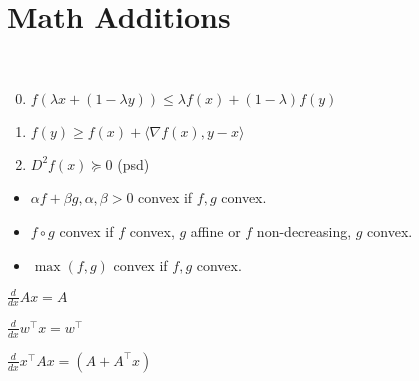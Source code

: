 \section{Math Additions}

\begin{definition}[Convexity] \
  \begin{enumerate}
    \setcounter{enumi}{-1}
    \item \(f(\lambda x + (1 - \lambda y)) \leq \lambda f(x) + (1 - \lambda)f(y)\)
    \item \(f(y) \geq f(x) + \langle \nabla f(x), y - x \rangle\)
    \item \(D^2f(x) \succeq 0\) (psd)
  \end{enumerate}
  \begin{itemize}
    \item \(\alpha f + \beta g, \alpha, \beta > 0\) convex if \(f, g\) convex.
    \item \(f \circ g\) convex if \(f\) convex, \(g\) affine or \(f\) non-decreasing, \(g\) convex.
    \item \(\max(f, g)\) convex if \(f, g\) convex.
  \end{itemize}
\end{definition}

\begin{definition}
  \begin{itemize*}
    \item \(\frac{d}{dx}Ax = A\)
    \item \(\frac{d}{dx}w^\top x = w^\top\)
    \item \(\frac{d}{dx} x^\top A x = (A + A^\top x)\)
  \end{itemize*}
\end{definition}